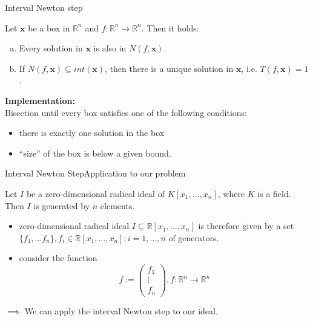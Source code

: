 \documentclass[german,10pt,xcolor=colortbl,compress,handout]{beamer}
\begin{document}
\begin{frame}{Interval Newton step}
    \begin{theorem}
        Let $\mathbf{x}$ be a box in $\mathbb{R}^n$ and $f:\mathbb{R}^n\to \mathbb{R}^n$.
        Then it holds:
        \begin{enumerate}[a)]
            \item Every solution in $\mathbf{x}$ is also in $N(f,\mathbf{x})$.
                \pause
            \item If $N(f,\mathbf{x}) \subseteq int(\mathbf{x})$, then there is a unique
                solution in $\mathbf{x}$, i.e. $T(f,\mathbf{x})=1$.
        \end{enumerate}
    \end{theorem}
    \pause

    \textbf{Implementation:} \\
    Bisection until every box satisfies one of the following conditions:
    \pause
    \begin{itemize}
        \item there is exactly one solution in the box
        \item \enquote{size} of the box is below a given bound.
    \end{itemize}
\end{frame}


\begin{frame}{Interval Newton Step}{Application to our problem}
    \begin{theorem}
        Let $I$ be a zero-dimensional radical ideal of $K[x_1, \hdots, x_n]$, where $K$ is
        a field. Then $I$ is generated by $n$ elements.
    \end{theorem}

    \begin{itemize}
        \item zero-dimensional radical ideal $I \subseteq \mathbb{R}[x_1, \hdots, x_n]$ is
            therefore given by a set $\{f_1, \hdots f_n\}, f_i \in \mathbb{R}[x_1, \hdots,
            x_n]; i=1,\hdots,n$ of generators.
            \pause
        \item consider the function
            \begin{equation*}
                f:= \begin{pmatrix} f_1\\ \vdots \\ f_n \end{pmatrix},
                f:\mathbb{R}^n\to \mathbb{R}^n
            \end{equation*}
        \pause
    \end{itemize}
    $\implies$ We can apply the interval Newton step to our ideal.
\end{frame}
\end{document}
